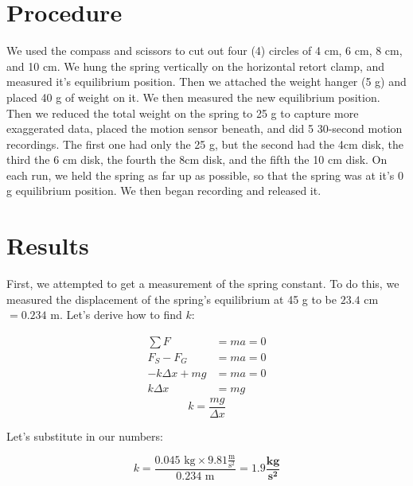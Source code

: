 \documentclass[12pt,letterpaper]{article}
\begin{document}
\section{Procedure}

 We used the compass and scissors to cut out four (4) circles of 4 cm, 6 cm, 8 cm, and 10 cm. We hung the spring vertically on the horizontal retort clamp, and measured it's equilibrium position. Then we attached the weight hanger (5 g) and placed 40 g of weight on it. We then measured the new equilibrium position. Then we reduced the total weight on the spring to 25 g to capture more exaggerated data, placed the motion sensor beneath, and did 5 30-second motion recordings. The first one had only the 25 g, but the second had the 4cm disk, the third the 6 cm disk, the fourth the 8cm disk, and the fifth the 10 cm disk. On each run, we held the spring as far up as possible, so that the spring was at it's 0 g equilibrium position. We then began recording and released it.

\section{Results}

First, we attempted to get a measurement of the spring constant. To do this, we measured the displacement of the spring's equilibrium at 45 g to be $23.4$ cm $=0.234$ m. Let's derive how to find $k$:

\begin{align*}
    \sum F&=ma = 0 \\
    F_S-F_G&=ma = 0 \\
    -k\Delta x+mg&=ma = 0 \\
    k\Delta x&=mg
\end{align*}
\begin{equation}
    k=\frac{mg}{\Delta x}
\end{equation}

Let's substitute in our numbers:

\begin{equation*}
    k=\frac{0.045 \text{ kg} \times 9.81 \frac{\text{m}}{\text{s}^2}}{0.234 \text{ m}} = \mathbf{1.9} \frac{\textbf{kg}}{\textbf{s}^\mathbf{2}}
\end{equation*}
\end{document}
